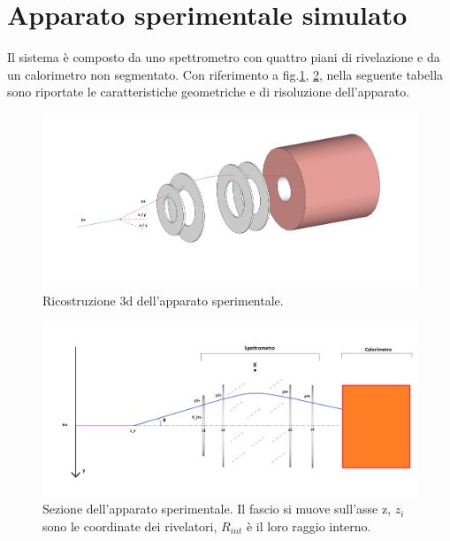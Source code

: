 \documentclass[8pt]{extarticle}
\begin{document}
\section{Apparato sperimentale simulato} \label{sec:apparato}
\justify
Il sistema è composto da uno spettrometro con quattro piani di rivelazione e da un calorimetro non segmentato. Con riferimento a fig.\ref{fig:apparato_rare_3d}, \ref{fig:apparato_rare_2d}, nella seguente tabella sono riportate le caratteristiche geometriche e di risoluzione dell'apparato. \\


\begin{figure}
\includegraphics[scale=0.3]{apparato_rare_3d}
\caption{Ricostruzione 3d dell'apparato sperimentale.}
\label{fig:apparato_rare_3d}
\end{figure}

\begin{figure}
\includegraphics[scale=0.3]{apparato_rare_2d}
\caption{Sezione dell'apparato sperimentale. Il fascio si muove sull'asse z, $z_i$ sono le coordinate dei rivelatori, $R_{int}$ è il loro raggio interno.}
\label{fig:apparato_rare_2d}
\end{figure}
\end{document}
